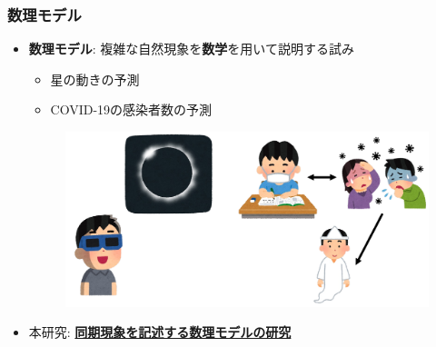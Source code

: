\begin{frame}
  \frametitle{数理モデル}
  \begin{itemize}
    \item \textbf{数理モデル}: 複雑な自然現象を\textbf{数学}を用いて説明する試み
    \begin{itemize}
      \item 星の動きの予測
      \item COVID-19の感染者数の予測
    \end{itemize}
    \begin{figure}
      \includegraphics[height=0.4\textheight]{figs/mathematical_model.pdf}
    \end{figure}
    \item 本研究: \underline{\textbf{同期現象を記述する数理モデルの研究}}
  \end{itemize}
\end{frame}

